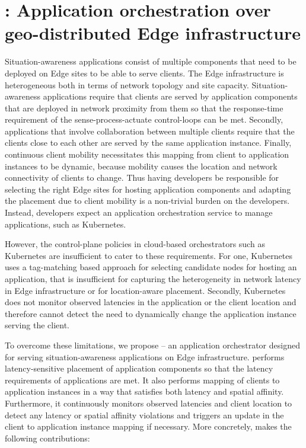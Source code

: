 \chapter{\oneedge{}: Application orchestration over geo-distributed Edge infrastructure}
\label{sec:oneedge}

\par Situation-awareness applications consist of multiple components that need to be deployed on Edge sites to be able to serve clients. The Edge infrastructure is heterogeneous both in terms of network topology and site capacity. Situation-awareness applications require that clients are served by application components that are deployed in network proximity from them so that the response-time requirement of the sense-process-actuate control-loops can be met. Secondly, applications that involve collaboration between multiple clients require that the clients close to each other are served by the same application instance. Finally, continuous client mobility necessitates this mapping from client to application instances to be dynamic, because mobility causes the location and network connectivity of clients to change. Thus having  developers be responsible for selecting the right Edge sites for hosting application components and adapting the placement due to client mobility is a non-trivial burden on the developers. Instead, developers expect an application orchestration service to manage applications, such as Kubernetes. 
\par However, the control-plane policies in cloud-based orchestrators such as Kubernetes  are insufficient to cater to these requirements. For one, Kubernetes uses a tag-matching based approach for selecting candidate nodes for hosting an application, that is insufficient for capturing the heterogeneity in network latency in Edge infrastructure or for location-aware placement. Secondly, Kubernetes does not monitor observed latencies in the application or the client location and therefore cannot detect the need to dynamically change the application instance serving the client.
\par To overcome these limitations, we propose \oneedge{} -- an application orchestrator designed for serving situation-awareness applications on Edge infrastructure. \oneedge{} performs latency-sensitive placement of application components so that the latency requirements of applications are met. It also performs mapping of clients to application instances in a way that satisfies both latency and spatial affinity. Furthermore, it continuously monitors observed latencies and client location to detect any latency or spatial affinity violations and triggers an update in the client to application instance mapping if necessary. More concretely, \oneedge{} makes the following contributions:

